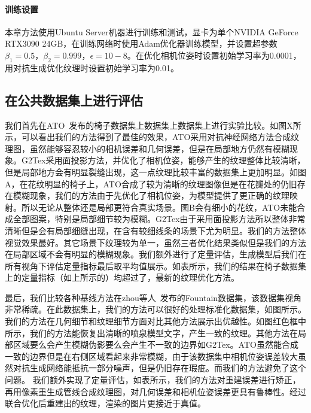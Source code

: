 \paragraph*{训练设置}
本章方法使用Ubuntu Server机器进行训练和测试，显卡为单个NVIDIA GeForce RTX3090 24GB，在训练网络时使用Adam优化器训练模型，并设置超参数$\beta_1=0.5，\beta_2=0.999，\epsilon =10-8$。在优化相机位姿时设置初始学习率为0.0001，用对抗生成优化纹理时设置初始学习率为0.01。


%
\subsection{在公共数据集上进行评估}
我们首先在ATO~\cite{JingweiHuang2020AdversarialTO}发布的椅子数据集上数据集上数据集上进行实验比较。如图X所示，可以看出我们的方法得到了最佳的效果，ATO采用对抗神经网络方法合成纹理图，虽然能够容忍较小的相机误差和几何误差，但是在局部地方仍然有模糊现象。G2Tex采用面投影方法，并优化了相机位姿，能够产生的纹理整体比较清晰，但是局部地方会有明显裂缝出现，这一点纹理比较丰富的数据集上更加明显。如图A，在花纹明显的椅子上，ATO合成了较为清晰的纹理图像但是在花瓣处的仍旧存在模糊现象，我们的方法由于先优化了相机位姿，为模型提供了更正确的纹理映射。所以无论从整体还是局部更符合真实场景。图B会有细小的花纹，ATO未能合成全部图案，特别是局部细节较为模糊。G2Tex由于采用面投影方法所以整体非常清晰但是会有局部细缝出现，在含有较细线条的场景下尤为明显。我们的方法整体视觉效果最好。其它场景下纹理较为单一，虽然三者优化结果类似但是我们的方法在局部区域不会有明显的模糊现象。我们额外进行了定量评估，生成模型后我们在所有视角下评估定量指标最后取平均值展示。如表所示，我们的结果在椅子数据集上的定量指标（如上所示的）均超过了，最新的纹理优化方法。\par

最后，我们比较各种基线方法在zhou等人~\cite{Zhou2018}发布的Fountain数据集，该数据集视角非常稀疏。在此数据集上，我们的方法可以很好的处理标准化数据集，如图所示。我们的方法在几何细节和纹理细节方面对比其他方法展示出优越性。如图红色框中所示，我们的方法能恢复出清晰的喷泉模型文字，产生一致的纹理。其他方法在局部区域要么会产生模糊伪影要么会产生不一致的边界如G2Tex。ATO虽然能合成一致的边界但是在右侧区域看起来非常模糊，由于该数据集中相机位姿误差较大虽然对抗生成网络能抵抗一部分噪声，但是仍旧存在瑕疵。而我们的方法避免了这个问题。
我们额外实现了定量评估，如表所示，我们的方法对重建误差进行矫正，再用像素重生成管线合成纹理图，对几何误差和相机位姿误差更具有鲁棒性。经过联合优化后重建出的纹理，渲染的图片更接近于真值。\par

